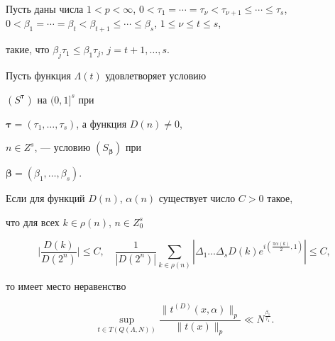 \begin{thm} 


Пусть даны числа $1<p<\infty$, $0<\tau_1=\dotsb=\tau_{\nu}<


\tau_{\nu+1}\leq\dotsb\leq{\tau_s}$, $0<\beta_1=\dotsb=\beta_t


<\beta_{t+1}\leq\dotsb\leq\beta_s$, $1 \leq \nu\leq t \leq s$, 


такие, что $\beta_j \tau_1\leq \beta_1 \tau_j$, $j=t+1,\dotsc,s$. 


Пусть функция $\Lambda(t)$ удовлетворяет условию 


$(S^{\boldsymbol{\tau}})$ на $(0,1]^s$ при


${\boldsymbol{\tau}}=(\tau_1,\dotsc,\tau_s)$, а функция $D(n)\neq 0$, 


$n\in Z^s$, --- условию $(S_{\boldsymbol{\beta}})$ при 


${\boldsymbol{\beta}}=(\beta_1,\dotsc,\beta_s)$.


Если для функций $D(n)$, $\alpha(n)$ существует число $C>0$ такое, 


что для всех $k\in \rho(n)$, $n\in {Z^s_0}$


\begin{equation} \label{d 3}


\bigg|\frac{D(k)}{D(2^{ n})}\bigg| \leq C, \quad


\frac{1}{|D(2^{n})|}\sum\limits_{k\in \rho(n)}


|\Delta_1\dotsc\Delta_s D(k) e^{i(\frac{\pi {\alpha}(k)}{2}, 1)}| \leq C,


\end{equation}


то имеет место неравенство 


\begin{equation} \label{d 4}


\sup_{t\in T(Q(\Lambda,N))}\frac{\|t^{(D)}(x,\alpha)


\|_p}{\| t(x)\|_p} \ll N^{\frac{\beta_1}{\tau_1}}.


\end{equation}


\end{thm}





